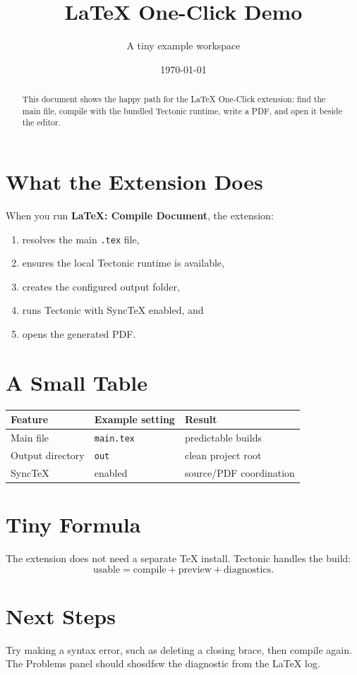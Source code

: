 \documentclass[11pt]{article}
\title{LaTeX One-Click Demo}
\author{A tiny example workspace}
\date{\today}
\begin{document}
\maketitle

\begin{abstract}
This document shows the happy path for the LaTeX One-Click extension:
find the main file, compile with the bundled Tectonic runtime, write a PDF,
and open it beside the editor.
\end{abstract}

\section{What the Extension Does}

When you run \textbf{LaTeX: Compile Document}, the extension:

\begin{enumerate}
  \item resolves the main \texttt{.tex} file,
  \item ensures the local Tectonic runtime is available,
  \item creates the configured output folder,
  \item runs Tectonic with SyncTeX enabled, and
  \item opens the generated PDF.
\end{enumerate}

\section{A Small Table}

\begin{center}
\begin{tabular}{lll}
\hline
Feature & Example setting & Result \\
\hline
Main file & \texttt{main.tex} & predictable builds \\
Output directory & \texttt{out} & clean project root \\
SyncTeX & enabled & source/PDF coordination \\
\hline
\end{tabular}
\end{center}



\section{Tiny Formula}

The extension does not need a separate TeX install. Tectonic handles the build:
\[
  \mathrm{usable} = \mathrm{compile} + \mathrm{preview} + \mathrm{diagnostics}.
\]

\section{Next Steps}

Try making a syntax error, such as deleting a closing brace, then compile again.
The Problems panel should shosdfsw the diagnostic from the LaTeX log.
\end{document}
